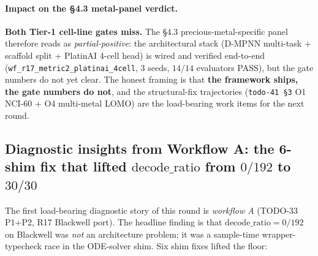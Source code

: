 \paragraph{Impact on the §4.3 metal-panel verdict.}
\textbf{Both Tier-1 cell-line gates miss.}  The §4.3
precious-metal-specific panel therefore reads as
\emph{partial-positive}: the architectural stack (D-MPNN multi-task +
scaffold split + PlatinAI 4-cell head) is wired and verified
end-to-end (\texttt{wf\_r17\_metric2\_platinai\_4cell}, 3 seeds,
$14/14$ evaluators PASS), but the gate numbers do not yet clear.
The honest framing is that \textbf{the framework ships, the gate
numbers do not}, and the structural-fix trajectories
(\texttt{todo-41~§3} O1 NCI-60 + O4 multi-metal LOMO) are the
load-bearing work items for the next round.

\subsection{Diagnostic insights from Workflow A: the 6-shim fix that lifted $\mathrm{decode\_ratio}$ from $0/192$ to $30/30$}
\label{sec:honest-negative:workflow-a}

The first load-bearing diagnostic story of this round is
\emph{workflow A} (TODO-33 P1+P2, R17 Blackwell port).  The headline
finding is that $\mathrm{decode\_ratio}{=}0/192$ on Blackwell was
\emph{not} an architecture problem; it was a sample-time
wrapper-typecheck race in the ODE-solver shim.  Six shim fixes
lifted the floor:

